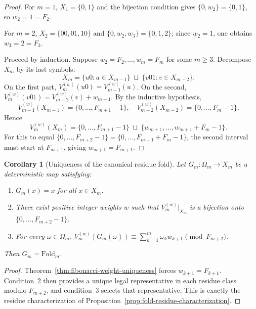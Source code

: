\documentclass[11pt,letterpaper]{article}
\numberwithin{equation}{section}
\theoremstyle{plain}
\newtheorem{corollary}[theorem]{Corollary}
\theoremstyle{definition}
\theoremstyle{remark}
\newcommand{\Fold}{\mathrm{Fold}}
\begin{document}
\begin{proof}
For \(m=1\), \(X_1=\{0,1\}\) and the bijection condition gives
\(\{0,w_2\}=\{0,1\}\), so \(w_2=1=F_2\).

For \(m=2\), \(X_2=\{00,01,10\}\) and \(\{0,w_2,w_3\}=\{0,1,2\}\); since
\(w_2=1\), one obtains \(w_3=2=F_3\).

Proceed by induction. Suppose \(w_2=F_2,\dots,w_m=F_m\) for some
\(m\ge 3\). Decompose \(X_m\) by its last symbols:
\[
X_m
=
\{u0: u\in X_{m-1}\}
\;\sqcup\;
\{v01: v\in X_{m-2}\}.
\]
On the first part, \(V_m^{(w)}(u0)=V_{m-1}^{(w)}(u)\). On the second,
\(V_m^{(w)}(v01)=V_{m-2}^{(w)}(v)+w_{m+1}\). By the inductive hypothesis,
\[
V_{m-1}^{(w)}(X_{m-1})=\{0,\dots,F_{m+1}-1\},
\quad
V_{m-2}^{(w)}(X_{m-2})=\{0,\dots,F_m-1\}.
\]
Hence
\[
V_m^{(w)}(X_m)
=
\{0,\dots,F_{m+1}-1\}
\;\sqcup\;
\{w_{m+1},\dots,w_{m+1}+F_m-1\}.
\]
For this to equal \(\{0,\dots,F_{m+2}-1\}=\{0,\dots,F_{m+1}+F_m-1\}\), the
second interval must start at \(F_{m+1}\), giving \(w_{m+1}=F_{m+1}\).
\end{proof}

\begin{corollary}[Uniqueness of the canonical residue fold]
\label{cor:canonical-fold-uniqueness}
Let \(G_m:\Omega_m\to X_m\) be a deterministic map satisfying:
\begin{enumerate}
\item \(G_m(x)=x\) for all \(x\in X_m\).
\item There exist positive integer weights \(w\) such that
  \(V_m^{(w)}|_{X_m}\) is a bijection onto \(\{0,\dots,F_{m+2}-1\}\).
\item For every \(\omega\in\Omega_m\),
  \(V_m^{(w)}(G_m(\omega))\equiv \sum_{k=1}^m\omega_k w_{k+1}
  \pmod{F_{m+2}}\).
\end{enumerate}
Then \(G_m=\Fold_m\).
\end{corollary}

\begin{proof}
Theorem~\ref{thm:fibonacci-weight-uniqueness} forces \(w_{k+1}=F_{k+1}\).
Condition~2 then provides a unique legal representative in each residue class
modulo \(F_{m+2}\), and condition~3 selects that representative. This is
exactly the residue characterization of
Proposition~\ref{prop:fold-residue-characterization}.
\end{proof}



\end{document}
